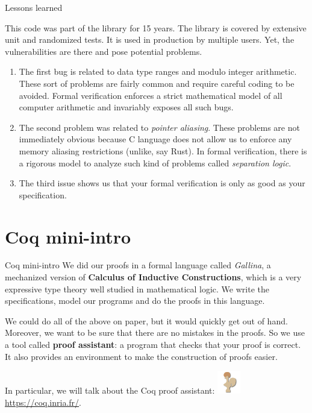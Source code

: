 \documentclass[10pt]{beamer}
\begin{document}
\begin{frame}{Lessons learned}

This code was part of the library for 15 years. The library is covered by extensive unit and randomized tests. It is used in production by multiple users. Yet, the vulnerabilities are there and pose potential problems.

\begin{enumerate}
    \item The first bug is related to data type ranges and modulo integer arithmetic. These sort of problems are fairly common and require careful coding to be avoided. Formal verification enforces a strict mathematical model of all computer arithmetic and invariably exposes all such bugs.
    \item The second problem was related to \textit{pointer aliasing}. These problems are not immediately obvious because C language does not allow us to enforce any memory aliasing restrictions (unlike, say Rust). In formal verification, there is a rigorous model to analyze such kind of problems called \textit{separation logic}.
    \item The third issue shows us that your formal verification is only as good as your specification.
\end{enumerate}

\end{frame}

\section{Coq mini-intro}

\begin{frame}{Coq mini-intro}
  We did our proofs in a formal language called {\it Gallina}, a mechanized version of {\bf Calculus of Inductive Constructions}, which is a very expressive type theory well studied in mathematical logic. We write the specifications, model our programs and do the proofs in this language.

  \smallskip
We could do all of the above on paper, but it would quickly get out of hand. Moreover, we want to be sure that there are no mistakes in the proofs. So we use a tool called {\bf proof assistant}: a program that checks that your proof is correct. It also provides an environment to make the construction of proofs easier. 

In particular, we will talk about the Coq proof assistant: \includegraphics[width=1cm]{coq.png} \url{https://coq.inria.fr/}.

\end{frame}
\end{document}
